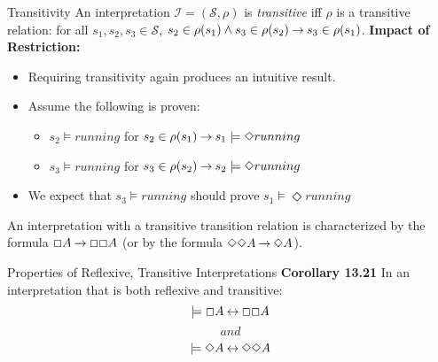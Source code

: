 \documentclass[style=sailor,size=12pt,mode=present]{powerdot}
\theoremstyle{definition}
\newenvironment{defn}[1]
  {\renewcommand\theinnerdefn{#1}\innerdefn}
  {\endinnerdefn}
\newenvironment{thm}[1]
  {\renewcommand\theinnerthm{#1}\innerthm}
  {\endinnerthm}
\begin{document}
\begin{wideslide}[bm=,toc=]{Transitivity}
\begin{defn}{13.18}[Ben Ari]
An interpretation $\mathcal{I} = (\mathcal{S},\rho)$ is \emph{transitive}
iff $\rho$ is a transitive relation: for all $s_1,s_2,s_3 \in \mathcal{S}$, 
$s_2 \in \rho(s_1) \land s_3 \in \rho(s_2) \mathbin{\rightarrow} s_3 \in \rho(s_1)$.
\end{defn}
{\bf Impact of Restriction:}
\begin{itemize}
\item Requiring transitivity again produces an intuitive result.
\item Assume the following is proven:
\begin{itemize}
\item $s_2 \models running$ for $s_2 \in \rho(s_1) \mathbin{\rightarrow} s_1 \models \Diamond running$
\item $s_3 \models running$ for $s_3 \in \rho(s_2) \mathbin{\rightarrow} s_2 \models \Diamond running$
\end{itemize}
\item We expect that $s_3 \models running$ should prove $s_1 \models \Diamond running$ 
\end{itemize}
\begin{thm}{13.17}
An interpretation with a transitive transition relation is characterized by the
formula $\Box A \mathbin{\rightarrow} \Box \Box A$ (or by the formula 
$\Diamond \Diamond A \mathbin{\rightarrow} \Diamond A$).
\end{thm}
\end{wideslide}
\begin{wideslide}[bm=,toc=]{Properties of Reflexive, Transitive Interpretations}
{\bf Corollary 13.21}
In an interpretation that is both reflexive and transitive:
\[
\models \Box A \mathbin{\leftrightarrow} \Box \Box A
\]
\[and\]
\[
\models \Diamond A \mathbin{\leftrightarrow} \Diamond \Diamond A
\]

\end{wideslide}
\end{document}
